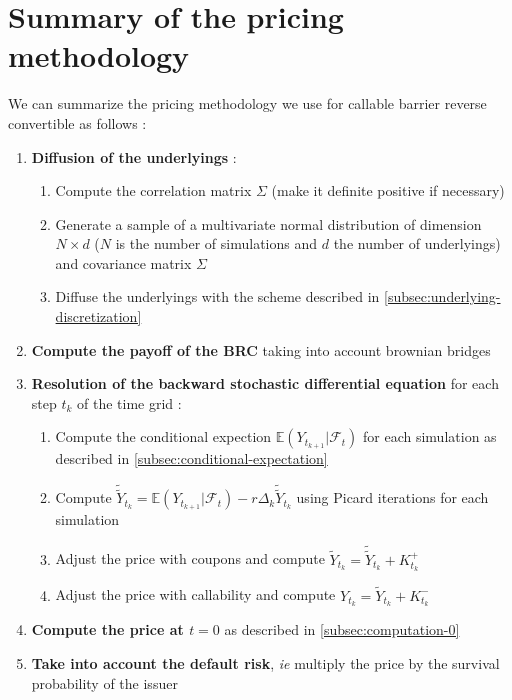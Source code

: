 \documentclass[a4paper,11pt,english]{book}
\begin{document}
\section{Summary of the pricing methodology}
We can summarize the pricing methodology we use for callable barrier reverse convertible as follows :
\begin{enumerate}
    \item \textbf{Diffusion of the underlyings} :
    \begin{enumerate}
        \item Compute the correlation matrix $\Sigma$ (make it definite positive if necessary)
        \item Generate a sample of a multivariate normal distribution of dimension $N\times d$ ($N$ is the number of simulations and $d$ the number of underlyings) and covariance matrix  $\Sigma$ 
        \item Diffuse the underlyings with the scheme described in \ref{subsec:underlying-discretization}
    \end{enumerate}
    \item \textbf{Compute the payoff of the BRC} taking into account brownian bridges
    \item \textbf{Resolution of the backward stochastic differential equation} for each step $t_{k}$ of the time grid :
    \begin{enumerate}
        \item Compute the conditional expection $\mathbb{E}(Y_{t_{k+1}}|\mathcal{F}_{t})$ for each simulation as described in \ref{subsec:conditional-expectation}
        \item Compute $\widetilde{\widetilde{Y}}_{t_{k}}=\mathbb{E}(Y_{t_{k+1}}|\mathcal{F}_{t}) -r\Delta_{k}\widetilde{\widetilde{Y}}_{t_{k}}$ using Picard iterations for each simulation
        \item Adjust the price with coupons and compute $\widetilde{Y}_{t_{k}} = \widetilde{\widetilde{Y}}_{t_{k}} + K_{t_{k}}^{+}$
        \item Adjust the price with callability and compute $Y_{t_{k}} = \widetilde{Y}_{t_{k}} + K_{t_{k}}^{-}$
    \end{enumerate}
    \item \textbf{Compute the price at $t=0$} as described in \ref{subsec:computation-0}
    \item \textbf{Take into account the default risk}, \textit{ie} multiply the price by the survival probability of the issuer
\end{enumerate}
\end{document}
